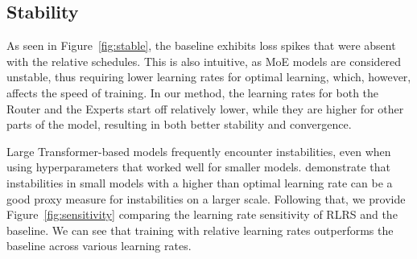 \documentclass{article} %
\begin{document}

    \subsection{Stability}




    As seen in Figure~\ref{fig:stable}, the baseline exhibits loss spikes that were absent with the relative schedules. This is also intuitive, as MoE models are considered unstable, thus requiring lower learning rates for optimal learning, which, however, affects the speed of training. In our method, the learning rates for both the Router and the Experts start off relatively lower, while they are higher for other parts of the model, resulting in both better stability and convergence.

    Large Transformer-based models frequently encounter instabilities, even when using hyperparameters that worked well for smaller models. \citet{wortsman2023small} demonstrate that instabilities in small models with a higher than optimal learning rate can be a good proxy measure for instabilities on a larger scale. Following that, we provide Figure~\ref{fig:sensitivity} comparing the learning rate sensitivity of RLRS and the baseline. We can see that training with relative learning rates outperforms the baseline across various learning rates.

\end{document}
